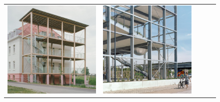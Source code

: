 \begin{figure}[H]
{\begin{tabular}{@{}ccccc@{}}
      \includegraphics[width=\linewidth]{Images/LoRAs/Modulariteit/Training_images/13.jpg} &
      \includegraphics[width=\linewidth]{Images/LoRAs/Modulariteit/Training_images/14.jpg} &

\end{tabular}}
\end{figure}
